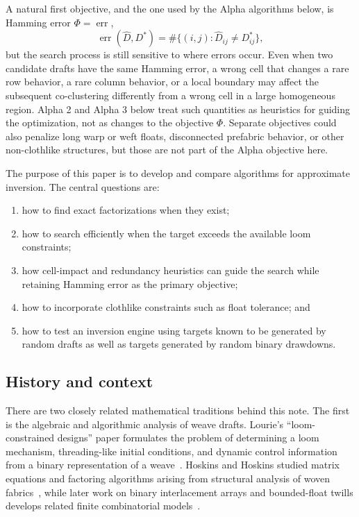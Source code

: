 \documentclass[11pt]{article}
\begin{document}
A natural first objective, and the one used by the Alpha algorithms below, is
Hamming error $\Phi=\operatorname{err}$,
\[
  \operatorname{err}(\widehat{D},D^\ast)
  =
  \#\{(i,j) : \widehat{D}_{ij} \ne D^\ast_{ij}\},
\]
but the search process is still sensitive to where errors occur. Even when two
candidate drafts have the same Hamming error, a wrong cell that changes a rare
row behavior, a rare column behavior, or a local boundary may affect the
subsequent co-clustering differently from a wrong cell in a large homogeneous
region. Alpha 2 and Alpha 3 below treat such quantities as heuristics for
guiding the optimization, not as changes to the objective \(\Phi\). Separate
objectives could also penalize long warp or weft floats, disconnected prefabric
behavior, or other non-clothlike structures, but those are not part of the Alpha
objective here.

The purpose of this paper is to develop and compare algorithms for approximate
inversion. The central questions are:
\begin{enumerate}[label=(\roman*)]
  \item how to find exact factorizations when they exist;
  \item how to search efficiently when the target exceeds the available loom
  constraints;
  \item how cell-impact and redundancy heuristics can guide the search while
  retaining Hamming error as the primary objective;
  \item how to incorporate clothlike constraints such as float tolerance; and
  \item how to test an inversion engine using targets known to be generated by
  random drafts as well as targets generated by random binary drawdowns.
\end{enumerate}

\subsection*{History and context}

There are two closely related mathematical traditions behind this note. The
first is the algebraic and algorithmic analysis of weave drafts. Lourie's
``loom-constrained designs'' paper formulates the problem of determining a loom
mechanism, threading-like initial conditions, and dynamic control information
from a binary representation of a weave~\cite{lourie1969}. Hoskins and Hoskins
studied matrix equations and factoring algorithms arising from structural
analysis of woven fabrics~\cite{hoskins1981,hoskins1983}, while later work on
binary interlacement arrays and bounded-float twills develops related finite
combinatorial models~\cite{hoskins1984,hpstreet1983}.
\end{document}
